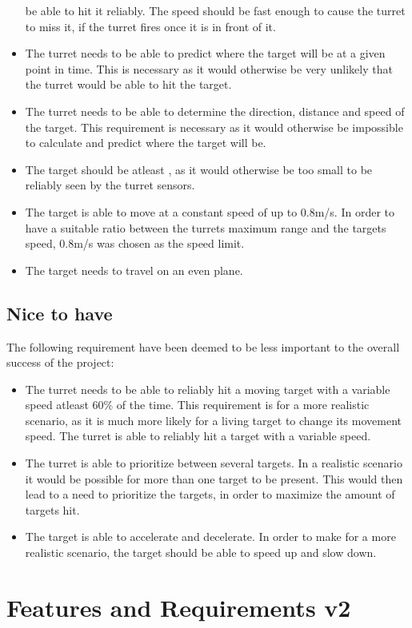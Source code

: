 \begin{itemize}
  be able to hit it reliably. The speed should be fast enough to cause the
  turret to miss it, if the turret fires once it is in front of it.
  \item The turret needs to be able to predict where the target will be at a given point
in time. This is necessary as it would otherwise be very unlikely that the
turret would be able to hit the target.
  \item The turret needs to be able to determine the direction, distance
  and speed of the target. This requirement is necessary as it would otherwise be impossible to
calculate and predict where the target will be.
  \item The target should be atleast , as it
would otherwise be too small to be reliably seen by the turret sensors.
  \item The target is able to move at a constant speed of up to 0.8m/s. In order to
have a suitable ratio between the turrets maximum range and the targets
speed, 0.8m/s was chosen as the speed limit.
  \item The target needs to travel on an even plane.
\end{itemize}

\subsection{Nice to have}
The following requirement have been deemed to be less important to the overall
success of the project:
\begin{itemize}
  \item The turret needs to be able to reliably hit a moving target with a
variable speed atleast 60\% of the time. This requirement is for a
more realistic scenario, as it is much more likely for a living target to
change its movement speed. The turret is able to reliably hit a target with a
variable speed.
  \item The turret is able to prioritize between several targets. In a realistic
scenario it would be possible for more than one target to be present. This would
then lead to a need to prioritize the targets, in order to maximize the
amount of targets hit.
  \item The target is able to accelerate and decelerate. In order to make for a
  more realistic scenario, the target should be able to speed up and slow down.
\end{itemize}

\section{Features and Requirements v2}

